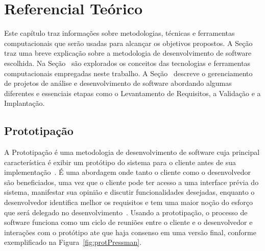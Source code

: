 \chapter{Referencial Teórico}
\label{Referencial_Teorico}


\newcommand{\texCommand}[1]{\texttt{\textbackslash{#1}}}%

\newcommand{\exemplo}[1]{%
\vspace{\baselineskip}%
\noindent\fbox{\begin{minipage}{\textwidth}#1\end{minipage}}%
\\\vspace{\baselineskip}}%

\newcommand{\exemploVerbatim}[1]{%
\vspace{\baselineskip}%
\noindent\fbox{\begin{minipage}{\textwidth}%
#1\end{minipage}}%
\\\vspace{\baselineskip}}%


Este capítulo traz informações sobre metodologias, técnicas e ferramentas computacionais que serão usadas para alcançar os objetivos propostos.
A Seção~ traz uma breve explicação sobre a metodologia de desenvolvimento de software escolhida.
Na Seção~ são explorados os conceitos das tecnologias e ferramentas computacionais empregadas neste trabalho.
A Seção~ descreve o gerenciamento de projetos de análise e desenvolvimento de software abordando algumas diferentes e essenciais etapas como o Levantamento de Requisitos, a Validação e a Implantação.

\section{Prototipação}\label{prototipacao}
\indent

A Prototipação é uma metodologia de desenvolvimento de software cuja principal característica é exibir um protótipo do sistema para o cliente antes de sua implementação~\citep{buchenau2000experience}.
É uma abordagem onde tanto o cliente como o desenvolvedor são beneficiados, uma vez que o cliente pode ter acesso a uma interface prévia do sistema, manifestar sua opinião e discutir funcionalidades desejadas, enquanto o desenvolvedor identifica melhor os requisitos e tem uma maior noção do esforço que será delegado no desenvolvimento~\citep{pressmanengenharia}. 
Usando a prototipação, o processo de software funciona como um ciclo de reuniões entre o cliente e o desenvolvedor e interações com o protótipo ate que haja consenso em uma versão final, conforme exemplificado na Figura~\ref{fig:protPressman}.  

